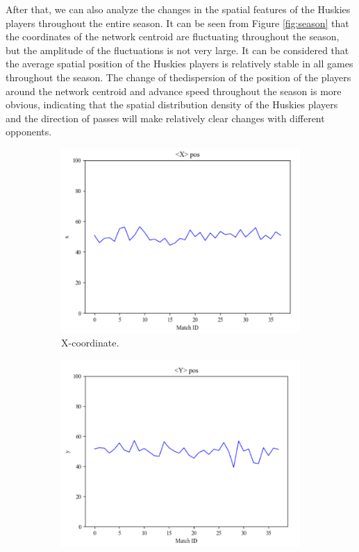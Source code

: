 \documentclass{mcmthesis}
\begin{document}
	After that, we can also analyze the changes in the spatial features of the Huskies players throughout the entire season.  It can be seen from Figure \ref{fig:season} that the coordinates of the network centroid are fluctuating throughout the season, but the amplitude of the fluctuations is not very large. It can be considered that the average spatial position of the Huskies players is relatively stable in all games throughout the season.  The change of thedispersion of the position of the players around the network centroid and advance speed throughout the season is more obvious, indicating that the spatial distribution density of the Huskies players and the direction of passes will make relatively clear changes with different opponents.

	\begin{figure}[h]
		\centering
		\begin{subfigure}[b]{0.24\textwidth}
			\includegraphics[width=\textwidth]{figures/xc2.png}
			\caption{X-coordinate.}
			\label{fig:x2}
		\end{subfigure}
		\begin{subfigure}[b]{0.24\textwidth}
			\includegraphics[width=\textwidth]{figures/yc2.png}

\end{subfigure}
\end{figure}
\end{document}
